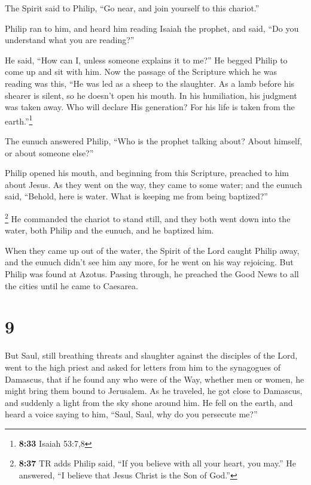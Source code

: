  The Spirit said to Philip, ``Go near, and join yourself
to this chariot.''

 Philip ran to him, and heard him reading Isaiah the
prophet, and said, ``Do you understand what you are reading?''

 He said, ``How can I, unless someone explains it to
me?'' He begged Philip to come up and sit with him.  Now
the passage of the Scripture which he was reading was this, ``He was led
as a sheep to the slaughter. As a lamb before his shearer is silent, so
he doesn't open his mouth.  In his humiliation, his
judgment was taken away. Who will declare His generation? For his life
is taken from the earth.''\footnote{\textbf{8:33} Isaiah 53:7,8}

 The eunuch answered Philip, ``Who is the prophet talking
about? About himself, or about someone else?''

 Philip opened his mouth, and beginning from this
Scripture, preached to him about Jesus.  As they went on
the way, they came to some water; and the eunuch said, ``Behold, here is
water. What is keeping me from being baptized?''

 \footnote{\textbf{8:37} TR adds Philip said, ``If you
  believe with all your heart, you may.'' He answered, ``I believe that
  Jesus Christ is the Son of God.''}  He commanded the
chariot to stand still, and they both went down into the water, both
Philip and the eunuch, and he baptized him.

 When they came up out of the water, the Spirit of the
Lord caught Philip away, and the eunuch didn't see him any more, for he
went on his way rejoicing.  But Philip was found at
Azotus. Passing through, he preached the Good News to all the cities
until he came to Caesarea.

\hypertarget{section-8}{%
\section{9}\label{section-8}}

 But Saul, still breathing threats and slaughter against
the disciples of the Lord, went to the high priest  and
asked for letters from him to the synagogues of Damascus, that if he
found any who were of the Way, whether men or women, he might bring them
bound to Jerusalem.  As he traveled, he got close to
Damascus, and suddenly a light from the sky shone around him.
 He fell on the earth, and heard a voice saying to him,
``Saul, Saul, why do you persecute me?''

